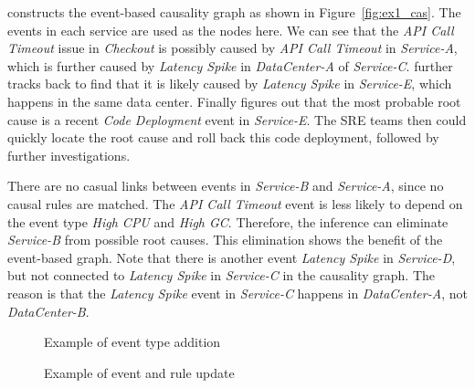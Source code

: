 \system constructs the event-based causality graph as shown in Figure~\ref{fig:ex1_cas}. The events in each service are used as the nodes here. %
We can see that the \emph{API Call Timeout} issue in \emph{Checkout} is possibly caused by \emph{API Call Timeout} in \emph{Service-A}, which is further caused by \emph{Latency Spike} in \emph{DataCenter-A} of \emph{Service-C}. \system further tracks back to find that it is likely caused by \emph{Latency Spike} in \emph{Service-E}, which happens in the same data center. Finally \system figures out that the most probable root cause is a recent \emph{Code Deployment} event in \emph{Service-E}. The SRE teams then could quickly locate the root cause and roll back this code deployment, followed by further investigations.

There are no casual links between events in \emph{Service-B} and \emph{Service-A}, since no causal rules are matched. The \emph{API Call Timeout} event is less likely to depend on the event type \emph{High CPU} and \emph{High GC}. Therefore, the inference can eliminate \emph{Service-B} from possible root causes. This elimination shows the benefit of the event-based graph. Note that there is another event \emph{Latency Spike} in \emph{Service-D}, but not connected to \emph{Latency Spike} in \emph{Service-C} in the causality graph. The reason is that the \emph{Latency Spike} event in \emph{Service-C} happens in \emph{DataCenter-A}, not \emph{DataCenter-B}. %

\begin{figure}[t]
\centering
{}
  \caption{Example of event type addition}
  \label{fig:ex2_n1}
\end{figure}

\begin{figure}[t]
\centering
{}
  \caption{Example of event and rule update}
  \label{fig:ex2_n2}
\end{figure}

